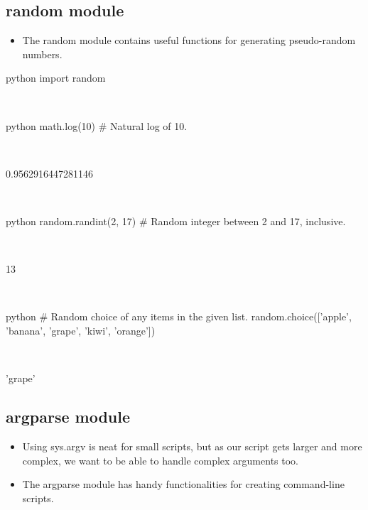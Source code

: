 \documentclass[aspectratio=1610,slidestop]{beamer}
\begin{document}
\subsection{random module}
\begin{pframe}
 \begin{itemize}
  \item The random module contains useful functions for generating
  pseudo-random numbers.
 \end{itemize}
 \begin{ipython}
  \begin{pythonin}{python}
import random
  \end{pythonin}
  \\
  \begin{pythonin}{python}
math.log(10)    # Natural log of 10.
  \end{pythonin}
  \\
  \begin{pythonout}
0.9562916447281146
  \end{pythonout}
  \\

  \begin{pythonin}{python}
random.randint(2, 17)    # Random integer between 2 and 17, inclusive.
  \end{pythonin}
  \\
  \begin{pythonout}
13
  \end{pythonout}
  \\

  \begin{pythonin}{python}
# Random choice of any items in the given list.
random.choice(['apple', 'banana', 'grape', 'kiwi', 'orange'])
  \end{pythonin}
  \\
  \begin{pythonout}
'grape'
  \end{pythonout}
 \end{ipython}
\end{pframe}


\subsection{argparse module}
\begin{pframe}
 \begin{itemize}
  \item Using sys.argv is neat for small scripts, but as our script gets larger
  and more complex, we want to be able to handle complex arguments too.
  \item The argparse module has handy functionalities for creating command-line
  scripts.
 \end{itemize}
\end{pframe}
\end{document}
